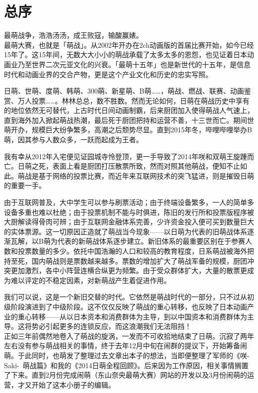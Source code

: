 \chapter*{总序}

最萌战争，浩浩汤汤，成王败寇，输酸赢婊。
\\

最萌大赛，也就是「萌战」。从2002年开办在2ch动画版的首届比赛开始，如今已经15年了。这15年间，无数大大小小的萌战承载了太多太多的恩怨，也见证着日本动画业乃至世界二次元亚文化的兴衰。「最萌十五年」也是新世代的十五年，是信息时代和动画业界的交合产物，更是这个产业文化和历史的忠实写照。

日萌、世萌、度萌、韩萌、300萌、新星萌、B萌……，萌战、燃战、联赛、动画鉴赏、万人投票……。林林总总，数不胜数。然而无论如何，日萌在萌战历史中享有的地位依然无可替代，上古时代日间动画制霸，后来厨团加入使得萌战人气速上，直到海外加入掀起萌战热潮，最后死于厨团把持和运营不善，十三世而亡。期间世萌开办，规模巨大纷争繁多，高潮之后颓势尽显。直到2015年冬，哔哩哔哩举办B萌，因其参与人数众多，一跃而起成为王者。

我有幸从2012年入宅便见证园城寺怜登顶，更一手导致了2014年咲和双萌王旋踵而亡。日萌之死，表面上看是厨团打压散票所致，然而对照其他萌战，便知不止如此。萌战是基于网络的投票比赛，而近年来互联网技术的突飞猛进，则是摧毁日萌的重要一手。

由于互联网普及，大中学生可以参与刷票活动；由于终端设备繁多，一人的简单多设备多重也难以杜绝；由于投票机制不能与时俱进，陈旧的发行所和投票版程序被大厨解读得骨肉可辨；由于互联网金融体系完善，少许资金投入便可买到数量巨大的实体票源。这一切原因正造就了萌战当今现象——以日萌为代表的旧萌战体系逐渐瓦解，以B萌为代表的新萌战体系逐步建立。新旧体系的最重要区别在于参赛人数和投票数量的多少。依托中国浩瀚的人口和较高的教育程度，日系萌战被海外把持至死，国内萌战则是票数越来越多。票数的增加扩大了萌战军备的规模，厨团冲突更加激烈，各中小阵营连横合纵更为频繁。由于受众群体扩大，大量的散票更成为难以评定的不稳定因素，对新萌战产生着促进作用。

我们可以说，这是一个新旧交替的时代。它依然是萌战时代的一部分，只不过从初级阶段演进到了中级阶段。这不仅仅反映了萌战的重心转移，也反映了日本动画产业的重心转移——从以日本资本和消费群体为主导，到以中国资本和消费群体为主导。这将势必引起更多的连锁反应，而这浪潮我们无法阻挡！
\\

正如三年前偶然地卷入了萌战的旋涡，一发而不可收拾地结束了日萌。沉寂了两年左右没有参与萌战相关的事情，终于去年12月中旬在闹群的提议下，开始筹备闹萌。于此同时，也萌发了整理过去文章出本子的想法，当即便整理了军师的《咲-Saki-~萌战篇》和我的《2014日萌全程回顾》。后来因为工作原因，相关事情搁置了下来。直到2月份完成闹萌（东山奈央最萌大赛）网站的开发以及3月份闹萌的运营，才又开始了这本小册子的编辑。

